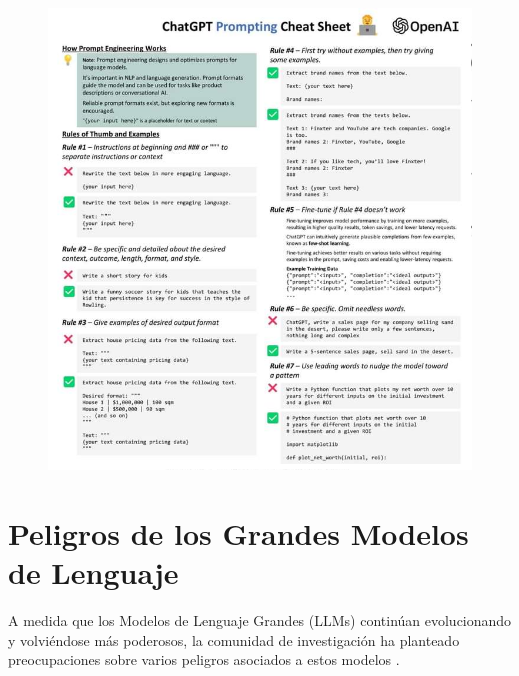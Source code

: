  \begin{figure}[h]
        	\includegraphics[scale = 0.33]{pics/prompting.png}
        \end{figure}


\section{Peligros de los Grandes Modelos de Lenguaje}
A medida que los Modelos de Lenguaje Grandes (LLMs) continúan evolucionando y volviéndose más poderosos, la comunidad de investigación ha planteado preocupaciones sobre varios peligros asociados a estos modelos \cite{bender2021dangers}.

